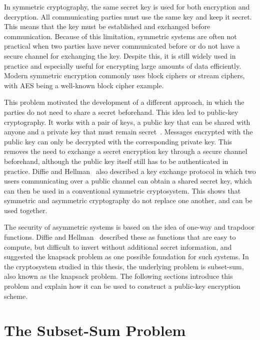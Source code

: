 In symmetric cryptography, the same secret key is used for both encryption and
decryption. All communicating parties must use the same key and keep it secret.
This means that the key must be established and exchanged before communication.
Because of this limitation, symmetric systems are often not practical when two
parties have never communicated before or do not have a secure channel for
exchanging the key. Despite this, it is still widely used in practice and
especially useful for encrypting large amounts of data efficiently. Modern
symmetric encryption commonly uses block ciphers or stream ciphers, with AES
being a well-known block cipher example.~\cite{ibm2023cryptography}

This problem motivated the development of a different approach, in which the
parties do not need to share a secret beforehand. This idea led to public-key
cryptography. It works with a pair of keys, a public key that can be shared
with anyone and a private key that must remain
secret~\cite[pp.~644--645]{diffie1976newDirections}. Messages encrypted with
the public key can only be decrypted with the corresponding private key. This
removes the need to exchange a secret encryption key through a secure channel
beforehand, although the public key itself still has to be authenticated in
practice. Diffie and Hellman~\cite[pp.~644, 648--649]{diffie1976newDirections}
also described a key exchange protocol in which two users
communicating over a public channel can obtain a shared secret key, which can
then be used in a conventional symmetric cryptosystem. This shows that
symmetric and asymmetric cryptography do not replace one another, and can be
used together.

The security of asymmetric systems is based on the idea of one-way and trapdoor
functions. Diffie and Hellman~\cite[pp.~650, 652--654]{diffie1976newDirections}
described these as functions that are easy to compute, but difficult to invert
without additional secret information, and suggested the knapsack problem as
one possible foundation for such systems. In the cryptosystem studied in this
thesis, the underlying problem is subset-sum, also known as the knapsack
problem. The following sections introduce this problem and explain how it can
be used to construct a public-key encryption scheme.

\section{The Subset-Sum Problem}
\label{sec:subset-sum-problem}


